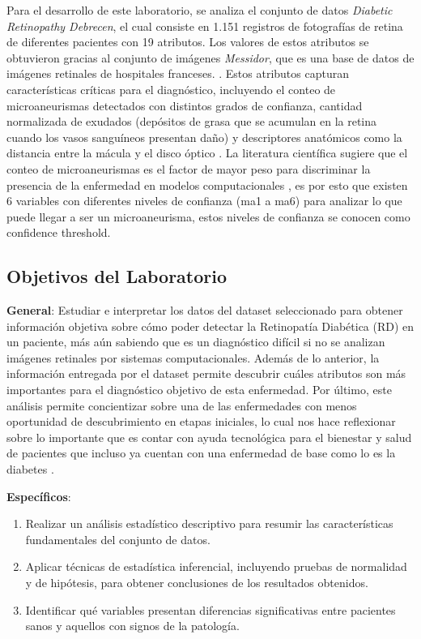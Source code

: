 Para el desarrollo de este laboratorio, se analiza el conjunto de datos \textit{Diabetic Retinopathy Debrecen}, el cual consiste en 1.151 registros de fotografías de retina de diferentes pacientes con 19 atributos. Los valores de estos atributos se obtuvieron gracias al conjunto de imágenes \textit{Messidor}, que es una base de datos de imágenes retinales de hospitales franceses. \parencite{antal2014dataset}. Estos atributos capturan características críticas para el diagnóstico, incluyendo el conteo de microaneurismas detectados con distintos grados de confianza, cantidad normalizada de exudados (depósitos de grasa que se acumulan en la retina cuando los vasos sanguíneos presentan daño) y descriptores anatómicos como la distancia entre la mácula y el disco óptico \parencite{antal2014dataset}. La literatura científica sugiere que el conteo de microaneurismas es el factor de mayor peso para discriminar la presencia de la enfermedad en modelos computacionales \parencite{casanova2014application}, es por esto que existen 6 variables con diferentes niveles de confianza (ma1 a ma6) para analizar lo que puede llegar a ser un microaneurisma, estos niveles de confianza se conocen como confidence threshold.

\subsection{Objetivos del Laboratorio}

\textbf{General}: Estudiar e interpretar los datos del dataset seleccionado para obtener información objetiva sobre cómo poder detectar la Retinopatía Diabética (RD) en un paciente, más aún sabiendo que es un diagnóstico difícil si no se analizan imágenes retinales por sistemas computacionales. Además de lo anterior, la información entregada por el dataset permite descubrir cuáles atributos son más importantes para el diagnóstico objetivo de esta enfermedad. Por último, este análisis permite concientizar sobre una de las enfermedades con menos oportunidad de descubrimiento en etapas iniciales, lo cual nos hace reflexionar sobre lo importante que es contar con ayuda tecnológica para el bienestar y salud de pacientes que incluso ya cuentan con una enfermedad de base como lo es la diabetes \parencite{antal2014dataset}.

\textbf{Específicos}:

\begin{enumerate}
    \item Realizar un análisis estadístico descriptivo para resumir las características fundamentales del conjunto de datos.
    \item Aplicar técnicas de estadística inferencial, incluyendo pruebas de normalidad y de hipótesis, para obtener conclusiones de los resultados obtenidos.
    \item Identificar qué variables presentan diferencias significativas entre pacientes sanos y aquellos con signos de la patología.
\end{enumerate}

